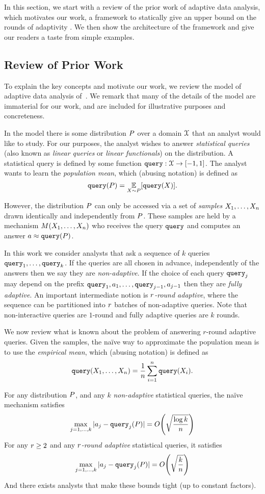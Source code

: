 In this section, we start with a review of the prior work of adaptive data analysis, which motivates our work, a framework to statically give an upper bound on the rounds of adaptivity . We then show the architecture of the framework and give our readers a taste from simple examples. 

\subsection{Review of Prior Work}

To explain the key concepts and motivate our work, we review the model of adaptive data analysis of~\cite{DworkFHPRR15,HU14}.  We remark that many of the details of the model are immaterial for our work, and are included for illustrative purposes and concreteness.  

In the model there is some distribution $P$ over a domain $\mathcal{X}$ that an analyst would like to study.  For our purposes, the analyst wishes to answer \emph{statistical queries} (also known as \emph{linear queries} or \emph{linear functionals}) on the distribution.  A statistical query is defined by some function ${\tt query} : \mathcal{X} \to [-1,1]$.  The analyst wants to learn the \emph{population mean}, which (abusing notation) is defined as $$\query(\dist) = \ex{\sample \sim \dist}{\query(\sample)}.$$

However, the distribution $P$ can only be accessed via a set of \emph{samples} $X_1,\dots,X_n$ drawn identically and independently from $P$.  These samples are held by a mechanism $M(X_1,\dots,X_n)$ who receives the query ${\tt query}$ and computes an answer $a \approx {\tt query}(P)$.

In this work we consider analysts that ask a sequence of $k$ queries ${\tt query}_1,\dots,{\tt query}_k$.  If the queries are all chosen in advance, independently of the answers then we say they are \emph{non-adaptive}.  If the choice of each query ${\tt query}_j$ may depend on the prefix ${\tt query}_1,a_1,\dots,{\tt query}_{j-1},a_{j-1}$ then they are \emph{fully adaptive}.  An important intermediate notion is \emph{$r$-round adaptive}, where the sequence can be partitioned into $r$ batches of non-adaptive queries.  Note that non-interactive queries are $1$-round and fully adaptive queries are $k$ rounds.

We now review what is known about the problem of answering $r$-round adaptive queries.  Given the samples, the na\"ive way to approximate the population mean is to use the \emph{empirical mean}, which (abusing notation) is defined as $${\tt query}(X_1,\dots,X_n) = \frac{1}{n} \sum_{i=1}^{n} {\tt query}(X_i).$$
\begin{thm} For any distribution $P$, and any $k$ \emph{non-adaptive} statistical queries, the na\"ive mechanism satisfies
$$
\max_{j=1,\dots,k} | \answer_j - \query_j(\dist) | = O\left( \sqrt{\frac{\log k}{n}}  \right)
$$
For any $r \geq 2$ and any \emph{$r$-round adaptive} statistical queries, it satisfies
$$
\max_{j=1,\dots,k} | \answer_j - \query_j(\dist) | = O\left( \sqrt{\frac{k}{n}}  \right)
$$
And there exists analysts that make these bounds tight (up to constant factors).
\end{thm}

